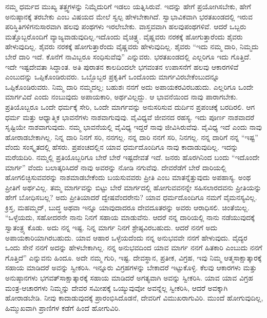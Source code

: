 ನಮ್ಮ ಧರ್ಮದ ಮುಖ್ಯ ತತ್ತ್ವಗಳನ್ನು ನಿಮ್ಮೆದುರಿಗೆ ಇಡಲು ಯತ್ನಿಸಿರುವೆ. ಇದನ್ನು ಹೇಗೆ ಪ್ರಯೋಗಿಸಬೇಕು, ಹೇಗೆ ಅನುಷ್ಠಾನಕ್ಕೆ ತರಬೇಕು ಎಂಬ ವಿಷಯದ ಮೇಲೆ ಸ್ವಲ್ಪ ಹೇಳಬೇಕಾಗಿದೆ. ಸ್ವಾಭಾವಿಕವಾಗಿ ಭರತಖಂಡದಲ್ಲಿ ಇರುವ ಪರಿಸ್ಥಿತಿಗಳಿಗನುಸಾರವಾಗಿ ಹಲವು ಪಂಥಗಳು ಇರಲೇಬೇಕು. ವಾಸ್ತವವಾಗಿ ಹಲವು\break ಪಂಥಗಳಿವೆ. ಆದರೆ ಒಬ್ಬರು ಮತ್ತೊಬ್ಬರೊಂದಿಗೆ ವ್ಯಾಜ್ಯವಾಡುವುದಿಲ್ಲ.\break ಇದೊಂದು ವೈಚಿತ್ರ್ಯ. ವೈಷ್ಣವರು ನರಕಕ್ಕೆ ಹೋಗುತ್ತಾರೆಂದು ಶೈವರು ಹೇಳುವುದಿಲ್ಲ. ಶೈವರು ನರಕಕ್ಕೆ ಹೋಗುತ್ತಾರೆಂದು ವೈಷ್ಣವರು ಹೇಳುವುದಿಲ್ಲ. ಶೈವರು “ಇದು ನಮ್ಮ ದಾರಿ, ನಿಮ್ಮದು ಬೇರೆ ದಾರಿ ಇದೆ. ಕೊನೆಗೆ ನಾವಿಬ್ಬರೂ ಸಂಧಿಸುವೆವು” ಎನ್ನುವರು. ಭರತಖಂಡದಲ್ಲಿ ಎಲ್ಲರಿಗೂ ಇದು ಗೊತ್ತಿದೆ. ಇದೇ ಇಷ್ಟದೇವತಾ ಸಿದ್ಧಾಂತ. ಅತಿ ಪುರಾತನ ಕಾಲದಿಂದಲೇ ಭಗವಂತನ ಉಪಾಸನೆಗೆ ಹಲವು ಆಕಾರಗಳಿವೆ ಎಂಬುದನ್ನು ಒಪ್ಪಿಕೊಂಡಿರುವರು. ಒಬ್ಬೊಬ್ಬರ ಪ್ರಕೃತಿಗೆ ಒಂದೊಂದು ಮಾರ್ಗವಿರಬೇಕೆಂಬುದನ್ನೂ ಒಪ್ಪಿಕೊಂಡಿರುವರು. ನಿಮ್ಮ ದಾರಿ ನಮ್ಮದಲ್ಲ; ಬಹುಶಃ ನನಗೆ ಅದು ಅಪಾಯಕರವಿರಬಹುದು. ಎಲ್ಲರಿಗೂ ಒಂದೇ ಮಾರ್ಗವಿದೆ ಎಂದು ನಂಬುವುದು ಅಪಾಯಕಾರಿ, ಅರ್ಥವಿಲ್ಲದ್ದು. ಆ ಭಾವನೆಯಿಂದ ನಾವು ಪಾರಾಗಬೇಕು. ಪ್ರತಿಯೊಬ್ಬರೂ ಒಂದೇ ಧರ್ಮಕ್ಕೆ ಸೇರಿ, ಒಂದೇ ಮಾರ್ಗವನ್ನು ಅನುಸರಿಸುವ ದುರ್ದಿನ ಪ್ರಪಂಚಕ್ಕೆ ಬರದಿರಲಿ. ಆಗ ಧರ್ಮ ಮತ್ತು ಆಧ್ಯಾತ್ಮಿಕ ಭಾವನೆಗಳು ನಾಶವಾಗುವುವು. ವೈವಿಧ್ಯವೆ ಜೀವನದ ರಹಸ್ಯ. ಇದು ಪೂರ್ಣ ನಾಶವಾದರೆ ಸೃಷ್ಟಿಯೇ ನಾಶವಾಗುವುದು. ನಮ್ಮ ಭಾವನೆಯಲ್ಲಿ ವೈವಿಧ್ಯ ಇದ್ದರೆ ನಾವು ಜೀವಿಸಿರುವೆವು. ವೈವಿಧ್ಯ ಇದೆ ಎಂದು ನಾವು ಹೋರಾಡಬೇಕಾಗಿಲ್ಲ. ನಿನ್ನ ದಾರಿ ನಿನಗೆ ಸರಿ, ನನಗಲ್ಲ. ನನ್ನ ದಾರಿ ನನಗೆ ಸರಿ, ನಿನಗಲ್ಲ. ನನ್ನ ದಾರಿಗೆ ನನ್ನ “ಇಷ್ಟ” ವೆಂದು ಸಂಸ್ಕೃತದಲ್ಲಿ ಹೆಸರು. ಪ್ರಪಂಚದಲ್ಲಿನ ಯಾವ ಧರ್ಮದೊಂದಿಗೂ ನಾವು ಕಾದಾಡುವುದಿಲ್ಲ. ಇದನ್ನು ಮರೆಯದಿರಿ. ನಮ್ಮಲ್ಲಿ ಪ್ರತಿಯೊಬ್ಬರಿಗೂ ಬೇರೆ ಬೇರೆ ಇಷ್ಟದೇವತೆ ಇದೆ. ಜನರು ಹೊರಗಿನಿಂದ ಬಂದು “ಇದೊಂದೇ ಮಾರ್ಗ” ವೆಂದು ಬಲಾತ್ಕರಿಸಿದರೆ ನಾವು ಅವರನ್ನು ನೋಡಿ ನಗುವೆವು. ದೇವರೆಡೆಗೆ ಬೇರೆ ದಾರಿಯಲ್ಲಿ ಹೋಗಲಿಚ್ಛಿಸುವವರನ್ನು ನಾಶಮಾಡಬೇಕೆಂದು ಬಯಸುವವರು ಪ್ರೀತಿ ಎಂಬ ಮಾತನ್ನೆತ್ತುವುದು ಅಪಹಾಸ್ಯ. ಅಂಥ ಪ್ರೀತಿಗೆ ಅರ್ಥವಿಲ್ಲ. ತಮ್ಮ ಮಾರ್ಗವನ್ನು ಬಿಟ್ಟು ಬೇರೆ ಮಾರ್ಗದಲ್ಲಿ ಹೋಗುವವನನ್ನೇ ಸಹಿಸಲಾರದವನು ಪ್ರೀತಿಯನ್ನು ಹೇಗೆ ಬೋಧಿಸಬಲ್ಲ? ಅದು ಪ್ರೀತಿಯಾದರೆ ದ್ವೇಷವೆಂದರೇನು? ಯಾವ ಧರ್ಮದೊಂದಿಗೂ ನಮಗೆ ವೈಮನಸ್ಯವಿಲ್ಲ. ಕ್ರಿಸ್ತ, ಮಹಮ್ಮದ್​, ಬುದ್ಧ ಅಥವಾ ಇನ್ನೂ ಯಾವುದಾದರೂ ದೇವದೂತರನ್ನು ಅವರು ಆರಾಧಿಸಲಿ. ಚಿಂತೆಯಿಲ್ಲ. “ಒಳ್ಳೆಯದು, ಸಹೋದರನೇ ನಾನು ನಿನಗೆ ಸಹಾಯ ಮಾಡುವೆನು. ಆದರೆ ನನ್ನ ದಾರಿಯಲ್ಲಿ ನಾನು ನಡೆಯುವುದಕ್ಕೆ ಸ್ವಾತಂತ್ರ್ಯ ಕೊಡು. ಅದು ನನ್ನ ಇಷ್ಟ. ನಿನ್ನ ಮಾರ್ಗ ನಿನಗೆ ಶ್ರೇಷ್ಠವಿರಬಹುದು. ಆದರೆ ನನಗೆ ಅದು ಅಪಾಯಕಾರಿಯಾಗಿರಬಹುದು. ಯಾವ ಆಹಾರ ಒಳ್ಳೆಯದೆಂದು ನನ್ನ ಅನುಭವವೇ ನನಗೆ ಹೇಳುವುದು. ವೈದ್ಯರ ಒಂದು ಸೇನೆ ನನಗೆ ಅದನ್ನು ಹೇಳಬೇಕಾಗಿಲ್ಲ. ನನ್ನ ಅನುಭವದಿಂದ ಯಾವ ಮಾರ್ಗ ನನಗೆ ಹಿತಕಾರಿ ಎಂಬುದು ನನಗೆ ಗೊತ್ತಿದೆ” ಎನ್ನುವನು ಹಿಂದೂ. ಅದೇ ನಮ್ಮ ಗುರಿ, ಇಷ್ಟ. ದೇವಸ್ಥಾನ, ಪ್ರತೀಕ, ವಿಗ್ರಹ, ಇವು ನಿಮ್ಮ ಆತ್ಮಸಾಕ್ಷಾತ್ಕಾರಕ್ಕೆ ಸಹಾಯ ಮಾಡಿದರೆ ಅವನ್ನು ಸ್ವೀಕರಿಸಿ. ಇನ್ನೂರು ವಿಗ್ರಹಗಳನ್ನು ಬೇಕಾದರೆ ಇಟ್ಟುಕೊಳ್ಳಿ. ಕೆಲವು ಆಕಾರಗಳು ಮತ್ತು ಅನುಷ್ಠಾನಗಳು ಭಗವತ್​ ಸಾಕ್ಷಾತ್ಕಾರಕ್ಕೆ ಸಹಾಯ ಮಾಡಿದರೆ ಅಗತ್ಯವಾಗಿ ಅವನ್ನು ಸ್ವೀಕರಿಸಿ. ಯಾವ ಯಾವ ವಿಗ್ರಹ ಮಂತ್ರ-ಆಚಾರಗಳು ನಿಮ್ಮನ್ನು ದೇವರ ಸಮೀಪಕ್ಕೆ ಒಯ್ಯುವುವೋ ಅವನ್ನೆಲ್ಲ ಸ್ವೀಕರಿಸಿ, ಆದರೆ ಅವಕ್ಕಾಗಿ ಹೋರಾಡಬೇಡಿ. ನೀವು ಕಾದಾಡುವುದಕ್ಕೆ ಪ್ರಾರಂಭಿಸಿದೊಡನೆ, ದೇವರಿಗೆ ವಿಮುಖರಾಗುವಿರಿ. ಮುಂದೆ ಹೋಗುವುದಿಲ್ಲ, ಹಿಮ್ಮುಖವಾಗಿ ಪ್ರಾಣಿಗಳ ಕಡೆಗೆ ಹಿಂದೆ ಹೋಗುವಿರಿ.


